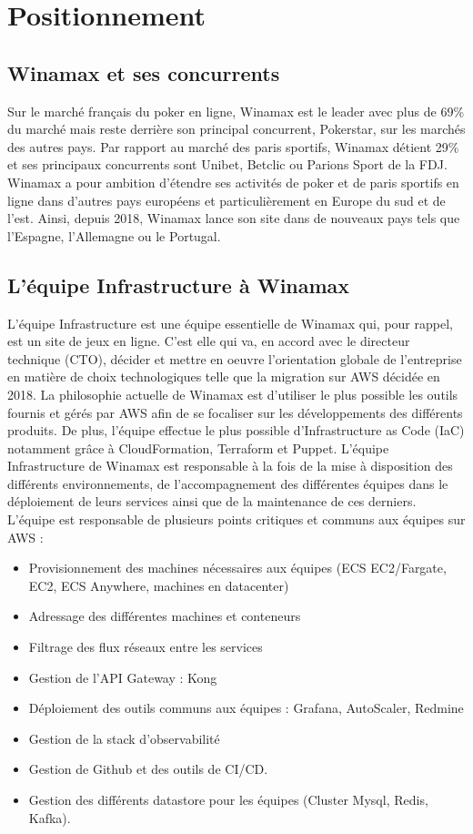 \chapter{Positionnement}

\section{Winamax et ses concurrents}

Sur le marché français du poker en ligne, Winamax est le leader avec plus
de 69\% du marché mais reste derrière son principal concurrent, Pokerstar, sur les
marchés des autres pays. Par rapport au marché des paris sportifs, Winamax détient
29\% et ses principaux concurrents sont Unibet, Betclic ou Parions Sport de la FDJ.
Winamax a pour ambition d’étendre ses activités de poker et de paris sportifs en
ligne dans d’autres pays européens et particulièrement en Europe du sud et de
l’est. Ainsi, depuis 2018, Winamax lance son site dans de nouveaux pays tels que
l’Espagne, l’Allemagne ou le Portugal.

\section{L’équipe Infrastructure à Winamax}

L’équipe Infrastructure est une équipe essentielle de Winamax qui, pour
rappel, est un site de jeux en ligne. C’est elle qui va, en accord avec le directeur
technique (CTO), décider et mettre en oeuvre l’orientation globale de l’entreprise
en matière de choix technologiques telle que la migration sur AWS décidée en 2018.
La philosophie actuelle de Winamax est d’utiliser le plus possible les outils fournis
et gérés par AWS afin de se focaliser sur les développements des différents produits.
De plus, l’équipe effectue le plus possible d’Infrastructure as Code (IaC) notamment
grâce à CloudFormation, Terraform et Puppet.
L’équipe Infrastructure de Winamax est responsable à la fois de la mise
à disposition des différents environnements, de l’accompagnement des différentes
équipes dans le déploiement de leurs services ainsi que de la maintenance de ces
derniers.
L’équipe est responsable de plusieurs points critiques et communs aux équipes
sur AWS :
\begin{itemize}
\item Provisionnement des machines nécessaires aux équipes (ECS EC2/Fargate,
EC2, ECS Anywhere, machines en datacenter)
\item Adressage des différentes machines et conteneurs
\item Filtrage des flux réseaux entre les services
\item Gestion de l’API Gateway : Kong
\item Déploiement des outils communs aux équipes : Grafana, AutoScaler, Redmine
\item Gestion de la stack d’observabilité
\item Gestion de Github et des outils de CI/CD.
\item Gestion des différents datastore pour les équipes (Cluster Mysql, Redis, Kafka).
\end{itemize}

